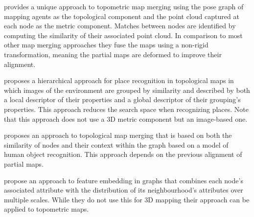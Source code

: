 \citet{bonanni_3-d_2017} provides a unique approach to topometric map merging using the pose graph of mapping agents as the topological component and the point cloud captured at each node as the metric component. Matches between nodes are identified by computing the similarity of their associated point cloud. In comparison to most other map merging approaches they fuse the maps using a non-rigid transformation, meaning the partial maps are deformed to improve their alignment. 

\citet{garcia-fidalgo_hierarchical_2017} proposes a hierarchical approach for place recognition in topological maps in which images of the environment are grouped by similarity and described by both a local descriptor of their properties and a global descriptor of their grouping's properties. This approach reduces the search space when recognizing places. Note that this approach does not use a 3D metric component but an image-based one.

\citet{rincon_map_2019} proposes an approach to topological map merging that is based on both the similarity of nodes and their context within the graph based on a model of human object recognition. This approach depends on the previous alignment of partial maps.

\citet{rozemberczki_multi-scale_2021} propose an approach to feature embedding in graphs that combines each node's associated attribute with the distribution of its neighbourhood's attributes over multiple scales. While they do not use this for 3D mapping their approach can be applied to topometric maps.